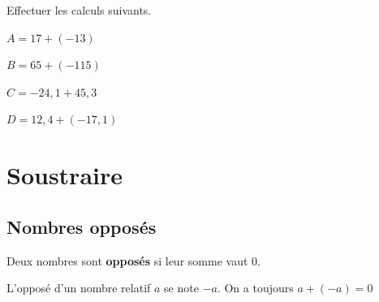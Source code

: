 \documentclass[a4paper]{book}
\begin{document}
    \begin{exemple}
        Effectuer les calculs suivants.

        \medskip
        
        \begin{minipage}{0.24\linewidth}
            $A = 17+ (-13)$

            \vspace{2cm}
        \end{minipage}
        \hfill\vline\hfill
        \begin{minipage}{0.24\linewidth}
            $B=65+(-115)$

            \vspace{2cm}
        \end{minipage}
        \hfill\vline\hfill
        \begin{minipage}{0.24\linewidth}
            $C=-24,1+45,3$

            \vspace{2cm}
        \end{minipage}
        \hfill\vline\hfill
        \begin{minipage}{0.24\linewidth}
            $D=12,4+(-17,1)$

            \vspace{2cm}
        \end{minipage}
    \end{exemple}

    
\section{Soustraire}
\subsection{Nombres opposés}

    \begin{definition}[Opposés]
        Deux nombres sont \textbf{opposés} si leur somme vaut 0.

        \medskip

        L'opposé d'un nombre relatif $a$ se note $-a$. On a toujours $a+(-a)=0$
    \end{definition}
    
\end{document}
